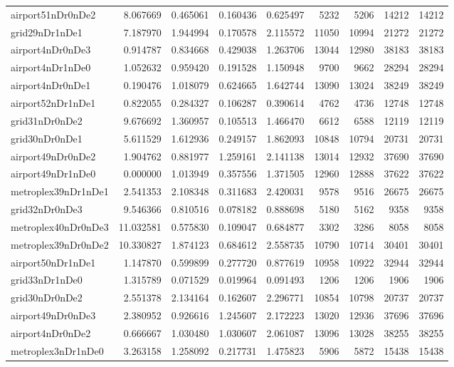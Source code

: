 \begin{longtable}{|l|r|r|r|r|r|r|r|r|}
airport51nDr0nDe2 & 8.067669 & 0.465061 & 0.160436 & 0.625497 & 5232 & 5206 & 14212 & 14212 \\
grid29nDr1nDe1 & 7.187970 & 1.944994 & 0.170578 & 2.115572 & 11050 & 10994 & 21272 & 21272 \\
airport4nDr0nDe3 & 0.914787 & 0.834668 & 0.429038 & 1.263706 & 13044 & 12980 & 38183 & 38183 \\
airport4nDr1nDe0 & 1.052632 & 0.959420 & 0.191528 & 1.150948 & 9700 & 9662 & 28294 & 28294 \\
airport4nDr0nDe1 & 0.190476 & 1.018079 & 0.624665 & 1.642744 & 13090 & 13024 & 38249 & 38249 \\
airport52nDr1nDe1 & 0.822055 & 0.284327 & 0.106287 & 0.390614 & 4762 & 4736 & 12748 & 12748 \\
grid31nDr0nDe2 & 9.676692 & 1.360957 & 0.105513 & 1.466470 & 6612 & 6588 & 12119 & 12119 \\
grid30nDr0nDe1 & 5.611529 & 1.612936 & 0.249157 & 1.862093 & 10848 & 10794 & 20731 & 20731 \\
airport49nDr0nDe2 & 1.904762 & 0.881977 & 1.259161 & 2.141138 & 13014 & 12932 & 37690 & 37690 \\
airport49nDr1nDe0 & 0.000000 & 1.013949 & 0.357556 & 1.371505 & 12960 & 12888 & 37622 & 37622 \\
metroplex39nDr1nDe1 & 2.541353 & 2.108348 & 0.311683 & 2.420031 & 9578 & 9516 & 26675 & 26675 \\
grid32nDr0nDe3 & 9.546366 & 0.810516 & 0.078182 & 0.888698 & 5180 & 5162 & 9358 & 9358 \\
metroplex40nDr0nDe3 & 11.032581 & 0.575830 & 0.109047 & 0.684877 & 3302 & 3286 & 8058 & 8058 \\
metroplex39nDr0nDe2 & 10.330827 & 1.874123 & 0.684612 & 2.558735 & 10790 & 10714 & 30401 & 30401 \\
airport50nDr1nDe1 & 1.147870 & 0.599899 & 0.277720 & 0.877619 & 10958 & 10922 & 32944 & 32944 \\
grid33nDr1nDe0 & 1.315789 & 0.071529 & 0.019964 & 0.091493 & 1206 & 1206 & 1906 & 1906 \\
grid30nDr0nDe2 & 2.551378 & 2.134164 & 0.162607 & 2.296771 & 10854 & 10798 & 20737 & 20737 \\
airport49nDr0nDe3 & 2.380952 & 0.926616 & 1.245607 & 2.172223 & 13020 & 12936 & 37696 & 37696 \\
airport4nDr0nDe2 & 0.666667 & 1.030480 & 1.030607 & 2.061087 & 13096 & 13028 & 38255 & 38255 \\
metroplex3nDr1nDe0 & 3.263158 & 1.258092 & 0.217731 & 1.475823 & 5906 & 5872 & 15438 & 15438 \\

\end{longtable}
